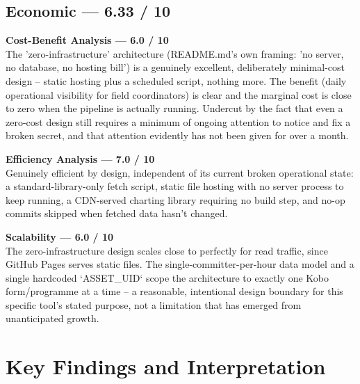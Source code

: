\documentclass[12pt, a4paper]{article}
\begin{document}
\subsection{Economic --- 6.33 / 10}
\begin{mdframed}[style=warnbox]\textbf{Cost-Benefit Analysis --- 6.0 / 10}\\
The 'zero-infrastructure' architecture (README.md's own framing: 'no server, no database, no hosting bill') is a genuinely excellent, deliberately minimal-cost design -- static hosting plus a scheduled script, nothing more. The benefit (daily operational visibility for field coordinators) is clear and the marginal cost is close to zero when the pipeline is actually running. Undercut by the fact that even a zero-cost design still requires a minimum of ongoing attention to notice and fix a broken secret, and that attention evidently has not been given for over a month.\end{mdframed}
\begin{mdframed}[style=greenbox]\textbf{Efficiency Analysis --- 7.0 / 10}\\
Genuinely efficient by design, independent of its current broken operational state: a standard-library-only fetch script, static file hosting with no server process to keep running, a CDN-served charting library requiring no build step, and no-op commits skipped when fetched data hasn't changed.\end{mdframed}
\begin{mdframed}[style=warnbox]\textbf{Scalability --- 6.0 / 10}\\
The zero-infrastructure design scales close to perfectly for read traffic, since GitHub Pages serves static files. The single-committer-per-hour data model and a single hardcoded `ASSET\_UID` scope the architecture to exactly one Kobo form/programme at a time -- a reasonable, intentional design boundary for this specific tool's stated purpose, not a limitation that has emerged from unanticipated growth.\end{mdframed}

\clearpage

\section{Key Findings and Interpretation}
\end{document}
